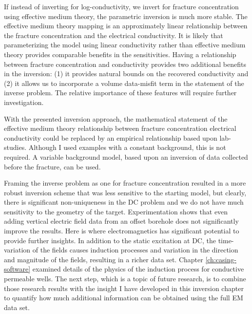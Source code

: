 If instead of inverting for log-conductivity, we invert for fracture concentration using effective medium theory, the parametric inversion is much more stable. The effective medium theory mapping is an approximately linear relationship between the fracture concentration and the electrical conductivity. It is likely that parameterizing the model using linear conductivity rather than effective medium theory provides comparable benefits in the sensitivities. Having a relationship between fracture concentration and conductivity provides two additional benefits in the inversion: (1) it provides natural bounds on the recovered conductivity and (2) it allows us to incorporate a volume data-misfit term in the statement of the inverse problem. The relative importance of these features will require further investigation.

With the presented inversion approach, the mathematical statement of the effective medium theory relationship between fracture concentration electrical conductivity could be replaced by an empirical relationship based upon lab-studies. Although I used examples with a constant background, this is not required. A variable background model, based upon an inversion of data collected before the fracture, can be used.

Framing the inverse problem as one for fracture concentration resulted in a more robust inversion scheme that was less sensitive to the starting model, but clearly, there is significant non-uniqueness in the DC problem and we do not have much sensitivity to the geometry of the target. Experimentation shows that even adding vertical electric field data from an offset borehole does not significantly improve the results. Here is where electromagnetics has significant potential to provide further insights. In addition to the static excitation at DC, the time-variation of the fields causes induction processes and variation in the direction and magnitude of the fields, resulting in a richer data set. Chapter \ref{ch:casing-software} examined details of the physics of the induction process for conductive permeable wells. The next step, which is a topic of future research, is to combine those research results with the insight I have developed in this inversion chapter to quantify how much additional information can be obtained using the full EM data set.
